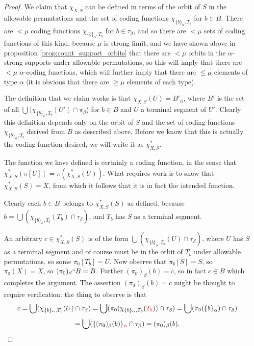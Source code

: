 \documentclass[112pt]{article}
\theoremstyle{definition}
\theoremstyle{remark}
\newcommand{\rk}[1]{{\color{blue}\sl #1}}
\newcommand{\suggest}[1]{{\color{red} #1}}
\begin{document}
\begin{proof}
We claim that $\chi_{X,S}$ can be defined in terms of the orbit of $S$ in the allowable permutations and the set of coding functions $\chi_{\{b\}_\alpha,T_b}$ for $b \in B$.  There are $<\mu$ coding functions $\chi_{\{b\}_\alpha,T_b}$ for $b \in \tau_\beta$, and so there are $<\mu$ sets of coding functions of this kind, because $\mu$ is strong limit, and we have shown above in proposition \ref{prop:count_support_orbits} that there are $<\mu$ orbits in the $\alpha$-strong supports under allowable permutations, so this will imply that there are $<\mu$ $\alpha$-coding functions, which will further imply that there are $\leq \mu$ elements of type $\alpha$ (it is obvious that there are $\geq \mu$ elements of each type).


The definition that we claim works is that $\chi_{X,S}(U) = B'_\alpha$, where $B'$ is the set of all $\bigcup (\chi_{\{b\}_\alpha,T_b}(U')\cap \pi_\beta$) for $b \in B$ and $U$ a terminal segment of  $U'$.  Clearly this definition depends only on the orbit of $S$ and the set of coding functions $\chi_{\{b\}_\alpha,T_b}$ derived from $B$ as described above.  Before we know that this is actually the coding function desired, we will write it as $\chi_{X,S}^*$.

The function we have defined is certainly a coding function, in the sense that $\chi_{X,S}^*(\pi[U]) = \pi(\chi_{X,S}^*(U))$.  What requires work is to show that
$\chi_{X,S}^*(S)=X$, from which it follows that it is in fact the intended function.

Clearly each $b \in B$ belongs to $\chi^*_{X,S}(S)$ as defined, because \newline $b = \bigcup (\chi_{\{b\}_\alpha,T_b}(T_b)\cap \tau_{\beta})$, and $T_b$ has $S$ as a terminal segment.

An arbitrary $c \in \chi_{X,S}^*(S)$ is of the form $\bigcup (\chi_{\{b\}_\alpha,T_b}(U)\cap \tau_{\beta})$, where $U$ has $S$ as a terminal segment and of course must be in the orbit of $T_b$ under allowable permutations, so some $\pi_0[T_b] = U$. Now observe that $\pi_0[S]=S$, so $\pi_0(X)=X$, so
$(\pi_0)_\beta``B=B$.  Further $(\pi_0)_\beta(b) = c$, so in fact $c \in B$ which completes the argument.  The assertion $(\pi_0)_\beta(b) = c$ might be thought to require verification:   the thing to observe is that
$$c=\bigcup (\chi_{\{b\}_\alpha,T_b}(U) \cap \tau_\beta)=\bigcup(\pi_0(\chi_{\{b\}_\alpha,T_b}(\suggest{T_b}))\cap \tau_\beta)=
\bigcup (\pi_0(\{b\}_\alpha)\cap \tau_\beta) $$
$$=\bigcup(\{(\pi_0)_\beta(b)\}_{\suggest{\alpha}} \cap \tau_\beta) = (\pi_0)_\beta(b).$$


\end{proof}
\end{document}
